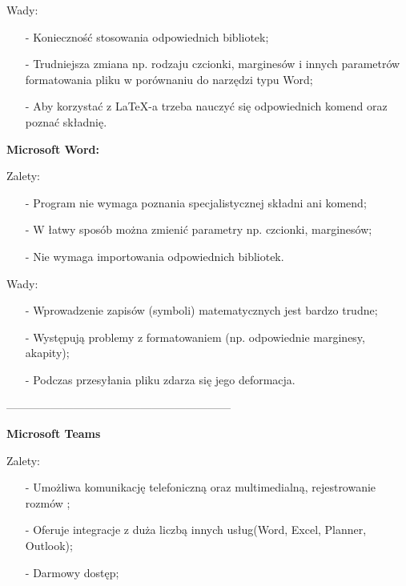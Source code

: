 \documentclass[a4paper,titleauthor]{mwart}
\begin{document}
\indent

Wady:
\begin{itemize}


\item[-]
Konieczność stosowania odpowiednich bibliotek;

\item[-]
Trudniejsza zmiana np. rodzaju czcionki, marginesów i innych parametrów formatowania pliku w porównaniu do narzędzi typu Word;

\item[-]
Aby korzystać z LaTeX-a trzeba nauczyć się odpowiednich komend oraz poznać składnię.
\end{itemize}

\vspace{1cm}
\textbf{Microsoft Word:}

\indent

Zalety:
\begin{itemize}

\item[-]
Program nie wymaga poznania specjalistycznej składni ani komend;
\item[-]
W łatwy sposób można zmienić parametry np. czcionki, marginesów;
\item[-]
Nie wymaga importowania odpowiednich bibliotek.
\end{itemize}

\indent

Wady:
\begin{itemize}

\item[-]
Wprowadzenie zapisów (symboli) matematycznych jest bardzo trudne;
\item[-]
 Występują problemy z formatowaniem (np. odpowiednie marginesy, akapity);
\item[-]
Podczas przesyłania pliku zdarza się jego deformacja.
\end{itemize}

------------------------------------------------------------\newline \newline
{} \newline 

\textbf{Microsoft Teams} \newline
\indent

Zalety:
\begin{itemize}

\item[-]
Umożliwa komunikację telefoniczną oraz multimedialną, rejestrowanie rozmów ;

\item[-]
Oferuje integracje z duża liczbą innych usług(Word, Excel, Planner, Outlook);

\item[-]
Darmowy dostęp;


\end{itemize}
\end{document}
